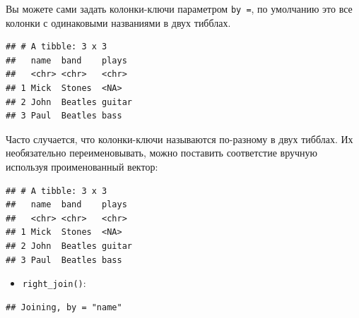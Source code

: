 \documentclass[]{book}
\newenvironment{Shaded}{\begin{snugshade}}{\end{snugshade}}
\newcommand{\KeywordTok}[1]{\textcolor[rgb]{0.13,0.29,0.53}{\textbf{#1}}}
\newcommand{\DataTypeTok}[1]{\textcolor[rgb]{0.13,0.29,0.53}{#1}}
\newcommand{\StringTok}[1]{\textcolor[rgb]{0.31,0.60,0.02}{#1}}
\newcommand{\OperatorTok}[1]{\textcolor[rgb]{0.81,0.36,0.00}{\textbf{#1}}}
\newcommand{\NormalTok}[1]{#1}
\providecommand{\tightlist}{%
  \setlength{\itemsep}{0pt}\setlength{\parskip}{0pt}}
\begin{document}
Вы можете сами задать колонки-ключи параметром \texttt{by\ =}, по
умолчанию это все колонки с одинаковыми названиями в двух тибблах.

\begin{Shaded}
\end{Shaded}

\begin{verbatim}
## # A tibble: 3 x 3
##   name  band    plays 
##   <chr> <chr>   <chr> 
## 1 Mick  Stones  <NA>  
## 2 John  Beatles guitar
## 3 Paul  Beatles bass
\end{verbatim}

Часто случается, что колонки-ключи называются по-разному в двух тибблах.
Их необязательно переименовывать, можно поставить соответстие вручную
используя проименованный вектор:

\begin{Shaded}
\end{Shaded}

\begin{verbatim}
## # A tibble: 3 x 3
##   name  band    plays 
##   <chr> <chr>   <chr> 
## 1 Mick  Stones  <NA>  
## 2 John  Beatles guitar
## 3 Paul  Beatles bass
\end{verbatim}

\begin{itemize}
\tightlist
\item
  \texttt{right\_join()}:
\end{itemize}

\begin{Shaded}
\end{Shaded}

\begin{verbatim}
## Joining, by = "name"
\end{verbatim}
\end{document}
